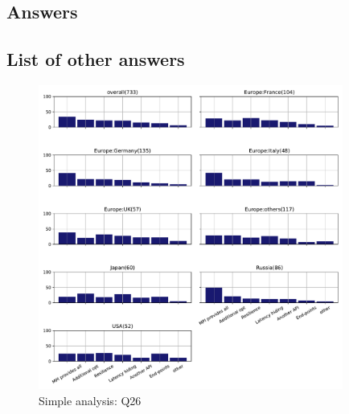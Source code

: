 
\subsection{Answers}


\subsection{List of other answers}
\begin{itemize}

\end{itemize}

\begin{figure}[htb]
\begin{center}
\includegraphics[width=10cm]{../pdfs/Q26.pdf}
\caption{Simple analysis: Q26}
\label{fig:Q26}
\end{center}
\end{figure}
